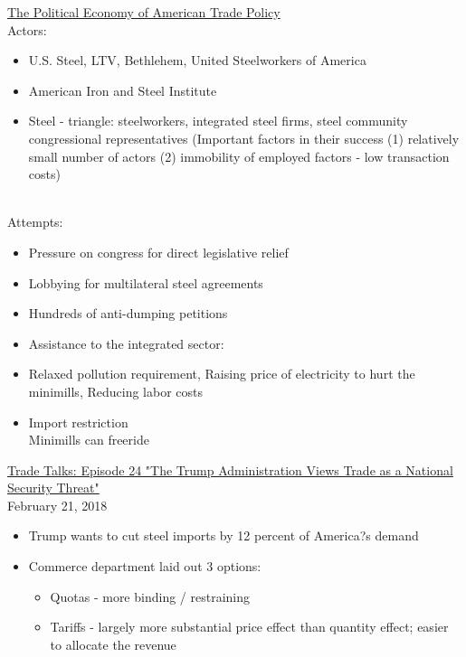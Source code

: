 \documentclass[10pt]{article}
\begin{document}
\begin{itemize}
\normalsize\underline{The Political Economy of American Trade Policy}\\
\normalsize Actors:\\
\begin{itemize}
  \item U.S. Steel, LTV, Bethlehem, United Steelworkers of America\\
  \item American Iron and Steel Institute\\
  \item Steel - triangle: steelworkers, integrated steel firms, steel community congressional representatives (Important factors in their success (1) relatively small number of actors (2) immobility of employed factors - low transaction costs)\\
\end{itemize}\\
\normalsize Attempts:\\
\begin{itemize}
  \item Pressure on congress for direct legislative relief\\ 
  \item Lobbying for multilateral steel agreements\\ 
  \item Hundreds of anti-dumping petitions\\ 
  \item Assistance to the integrated sector:\\
  \item Relaxed pollution requirement, Raising price of electricity to hurt the minimills, Reducing labor costs\\
  \item Import restriction\\ 
        Minimills can freeride\\
\end{itemize}
\normalsize\underline{Trade Talks: Episode 24 "The Trump Administration Views Trade as a National Security Threat"}\\
\normalsize February 21, 2018
\begin{itemize}
  \item Trump wants to cut steel imports by 12 percent of America?s demand 
  \item Commerce department laid out 3 options:
\begin{itemize}
\item Quotas - more binding / restraining
\item Tariffs - largely more substantial price effect than quantity effect; easier to allocate the revenue 

\end{itemize}
\end{itemize}
\end{itemize}
\end{document}
